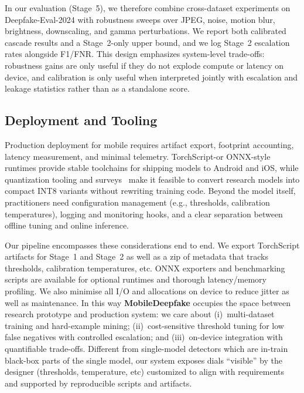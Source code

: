 In our evaluation (Stage~5), we therefore combine cross\hyp dataset experiments on Deepfake\hyp Eval\hyp 2024 with robustness sweeps over JPEG, noise, motion blur, brightness, downscaling, and gamma perturbations. We report both calibrated cascade results and a Stage~2\hyp only upper bound, and we log Stage~2 escalation rates alongside F1/FNR. This design emphasizes system\hyp level trade\hyp offs: robustness gains are only useful if they do not explode compute or latency on device, and calibration is only useful when interpreted jointly with escalation and leakage statistics rather than as a standalone score.

\subsection*{Deployment and Tooling}
Production deployment for mobile requires artifact export, footprint accounting, latency measurement, and minimal telemetry. TorchScript\hyp or ONNX\hyp style runtimes provide stable toolchains for shipping models to Android and iOS, while quantization tooling and surveys~\cite{gholami2021quant_survey} make it feasible to convert research models into compact INT8 variants without rewriting training code. Beyond the model itself, practitioners need configuration management (e.g., thresholds, calibration temperatures), logging and monitoring hooks, and a clear separation between offline tuning and online inference.

Our pipeline encompasses these considerations end to end. We export TorchScript artifacts for Stage~1 and Stage~2 as well as a zip of metadata that tracks thresholds, calibration temperatures, etc. ONNX exporters and benchmarking scripts are available for optional runtimes and thorough latency/memory profiling. We also minimise all I/O and allocations on device to reduce jitter as well as maintenance. In this way \textbf{MobileDeepfake} occupies the space between research prototype and production system: we care about (i)~multi\hyp dataset training and hard\hyp example mining; (ii)~cost\hyp sensitive threshold tuning for low false negatives with controlled escalation; and (iii)~on\hyp device integration with quantifiable trade\hyp offs. Different from single\hyp model detectors which are in\hyp train black\hyp box parts of the single model, our system exposes dials ``visible'' by the designer (thresholds, temperature, etc) customized to align with requirements and supported by reproducible scripts and artifacts.

